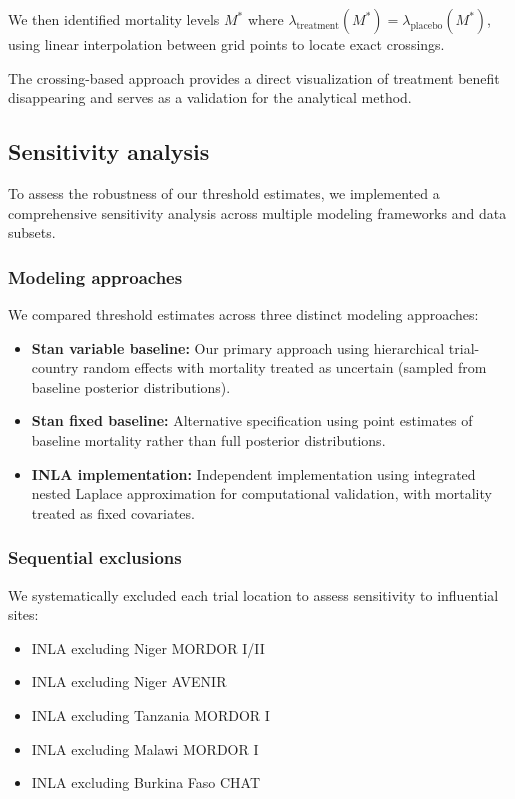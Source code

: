 \documentclass[11pt]{article}\usepackage[]{graphicx}\usepackage[]{xcolor}
\begin{document}
We then identified mortality levels $M^*$ where $\lambda_{\text{treatment}}(M^*) = \lambda_{\text{placebo}}(M^*)$, using linear interpolation between grid points to locate exact crossings.

The crossing-based approach provides a direct visualization of treatment benefit disappearing and serves as a validation for the analytical method.

\subsection{Sensitivity analysis}

To assess the robustness of our threshold estimates, we implemented a comprehensive sensitivity analysis across multiple modeling frameworks and data subsets.

\subsubsection{Modeling approaches}

We compared threshold estimates across three distinct modeling approaches:
\begin{itemize}
\item \textbf{Stan variable baseline:} Our primary approach using hierarchical trial-country random effects with mortality treated as uncertain (sampled from baseline posterior distributions).

\item \textbf{Stan fixed baseline:} Alternative specification using point estimates of baseline mortality rather than full posterior distributions.

\item \textbf{INLA implementation:} Independent implementation using integrated nested Laplace approximation for computational validation, with mortality treated as fixed covariates.
\end{itemize}

\subsubsection{Sequential exclusions}

We systematically excluded each trial location to assess sensitivity to influential sites:

\begin{itemize}
\item INLA excluding Niger MORDOR I/II
\item INLA excluding Niger AVENIR  
\item INLA excluding Tanzania MORDOR I
\item INLA excluding Malawi MORDOR I
\item INLA excluding Burkina Faso CHAT
\end{itemize}
\end{document}
